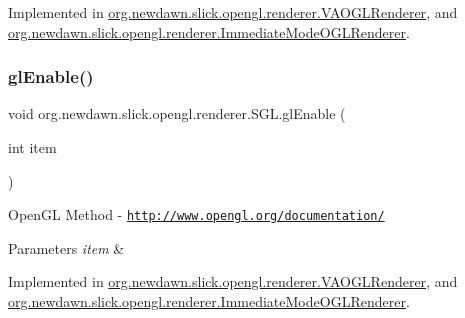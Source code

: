 Implemented in \mbox{\hyperlink{classorg_1_1newdawn_1_1slick_1_1opengl_1_1renderer_1_1_v_a_o_g_l_renderer_ad79f25ad984dc8c504495c628aaadb4e}{org.\+newdawn.\+slick.\+opengl.\+renderer.\+V\+A\+O\+G\+L\+Renderer}}, and \mbox{\hyperlink{classorg_1_1newdawn_1_1slick_1_1opengl_1_1renderer_1_1_immediate_mode_o_g_l_renderer_a98084664d41997626872ebedb5d76474}{org.\+newdawn.\+slick.\+opengl.\+renderer.\+Immediate\+Mode\+O\+G\+L\+Renderer}}.

\mbox{\label{interfaceorg_1_1newdawn_1_1slick_1_1opengl_1_1renderer_1_1_s_g_l_a35991f93081980b303d6ccc5bd88c8da}} 
\subsubsection{\texorpdfstring{gl\+Enable()}{glEnable()}}
{\footnotesize\ttfamily void org.\+newdawn.\+slick.\+opengl.\+renderer.\+S\+G\+L.\+gl\+Enable (\begin{DoxyParamCaption}\item[{int}]{item }\end{DoxyParamCaption})}

Open\+GL Method -\/  \href{http://www.opengl.org/documentation/}{\tt http\+://www.\+opengl.\+org/documentation/}


\begin{DoxyParams}{Parameters}
{\em item} & \\
\hline
\end{DoxyParams}


Implemented in \mbox{\hyperlink{classorg_1_1newdawn_1_1slick_1_1opengl_1_1renderer_1_1_v_a_o_g_l_renderer_a9da29b057439f8fdaffabe989241b3bd}{org.\+newdawn.\+slick.\+opengl.\+renderer.\+V\+A\+O\+G\+L\+Renderer}}, and \mbox{\hyperlink{classorg_1_1newdawn_1_1slick_1_1opengl_1_1renderer_1_1_immediate_mode_o_g_l_renderer_ac8ffe84c76858531fd8c872bef726bb9}{org.\+newdawn.\+slick.\+opengl.\+renderer.\+Immediate\+Mode\+O\+G\+L\+Renderer}}.

\mbox{\label{interfaceorg_1_1newdawn_1_1slick_1_1opengl_1_1renderer_1_1_s_g_l_a7f5666aaa59b12617ab81e1263140f72}} 
